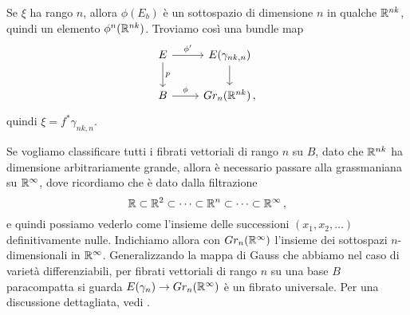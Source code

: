 \begin{oss}
	Se $\xi$ ha rango $n$, allora $\phi(E_{b})$ è un sottospazio di dimensione $n$
	in qualche ${\mathbb R}^{nk}$, quindi un elemento $\phi^{n}(\R^{nk})$.
	Troviamo così una bundle map
	\begin{equation*}
		\begin{tikzcd}
			E \ar[d, "p"] \ar[r, "\phi'"] 
			& E(\gamma_{nk,n}) \ar[d] \\
			B \ar[r, "\phi"] & Gr_{n}(\R^{nk})\,,
		\end{tikzcd}
	\end{equation*}
	quindi $\xi = f^{*}\gamma_{nk,n}$.
	
	Se vogliamo classificare tutti i fibrati vettoriali di rango $n$ su $B$,
	dato che ${\mathbb R}^{nk}$ ha dimensione arbitrariamente grande,
	allora è necessario passare alla grassmaniana su ${\mathbb R}^{\infty}$,
	dove ricordiamo che è dato dalla filtrazione
	\begin{equation*}
		{\mathbb R} \subset {\mathbb R}^{2} \subset \dots \subset {\mathbb R}^{n} \subset \dots \subset {\mathbb R}^{\infty}\,,
	\end{equation*}
	e quindi possiamo vederlo come l'insieme delle successioni
	$(x_{1}, x_{2}, \dots)$ definitivamente nulle.
	Indichiamo allora con $Gr_{n}({\mathbb R}^{\infty})$ l'insieme dei sottospazi
	$n$-dimensionali in ${\mathbb R}^{\infty}$.
	Generalizzando la mappa di Gauss che abbiamo nel caso di varietà differenziabili,
	per fibrati vettoriali di rango $n$ su una base $B$ paracompatta
	si guarda $E(\gamma_{n}) \to Gr_{n}({\mathbb R}^{\infty})$ è un fibrato universale.
	Per una discussione dettagliata, vedi \parencite[$\S 5$]{mi-sta}.
\end{oss}

